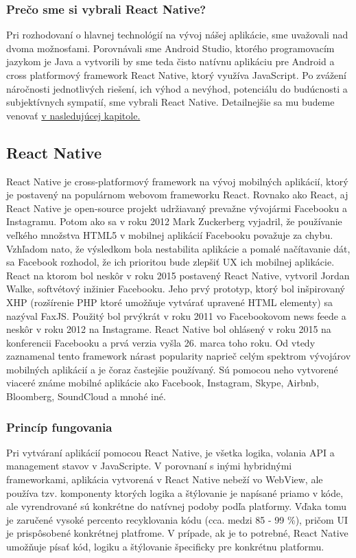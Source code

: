 \subsubsection{Prečo sme si vybrali React Native?}
Pri rozhodovaní o hlavnej technológií na vývoj nášej aplikácie, sme uvažovali nad dvoma možnosťami. Porovnávali sme Android Studio, ktorého programovacím jazykom je Java a vytvorili by sme teda čisto natívnu aplikáciu pre Android a cross platformový framework React Native, ktorý využíva JavaScript. Po zvážení náročnosti jednotlivých riešení, ich výhod a nevýhod, potenciálu do budúcnosti a subjektívnych sympatií, sme vybrali React Native. Detailnejšie sa mu budeme venovať \hyperref[sec:React Native]{v nasledujúcej kapitole.} \\


\subsection{React Native}
\label{sec:React Native}

React Native je cross-platformový framework na vývoj mobilných aplikácií, ktorý je postavený na populárnom webovom frameworku React. Rovnako ako React, aj React Native je open-source projekt udržiavaný prevažne vývojármi Facebooku a Instagramu. Potom ako sa v roku 2012 Mark Zuckerberg vyjadril, že používanie veľkého množstva HTML5 v mobilnej aplikácií Facebooku považuje za chybu. Vzhľadom nato, že výsledkom bola nestabilita aplikácie a pomalé načítavanie dát, sa Facebook rozhodol, že ich prioritou bude zlepšiť UX ich mobilnej aplikácie. React na ktorom bol neskôr v roku 2015 postavený React Native, vytvoril Jordan Walke, softvétový inžinier Facebooku. Jeho prvý prototyp, ktorý bol inšpirovaný XHP (rozšírenie PHP ktoré umožňuje vytvárať upravené HTML elementy) sa nazýval FaxJS. Použitý bol prvýkrát v roku 2011 vo Facebookovom news feede a neskôr v roku 2012 na Instagrame. React Native bol ohlásený v roku 2015 na konferencii Facebooku a prvá verzia vyšla 26. marca toho roku. Od vtedy zaznamenal tento framework nárast popularity naprieč celým spektrom vývojárov mobilných aplikácií a je čoraz častejšie používaný. Sú pomocou neho vytvorené viaceré známe mobilné aplikácie ako Facebook, Instagram, Skype, Airbnb, Bloomberg, SoundCloud a mnohé iné. \\
\subsubsection{Princíp fungovania}
Pri vytváraní aplikácií pomocou React Native, je všetka logika, volania API a management stavov v JavaScripte. V porovnaní s inými hybridnými frameworkami, aplikácia vytvorená v React Native nebeží vo WebView, ale používa tzv. komponenty ktorých logika a štýlovanie je napísané priamo v kóde, ale vyrendrované sú konkrétne do natívnej podoby podľa platformy. Vďaka tomu je zaručené vysoké percento recyklovania kódu (cca. medzi 85 - 99 \%), pričom UI je prispôsobené konkrétnej platfrome. V prípade, ak je to potrebné, React Native umožňuje písať kód, logiku a štýlovanie špecificky pre konkrétnu platformu. \\
